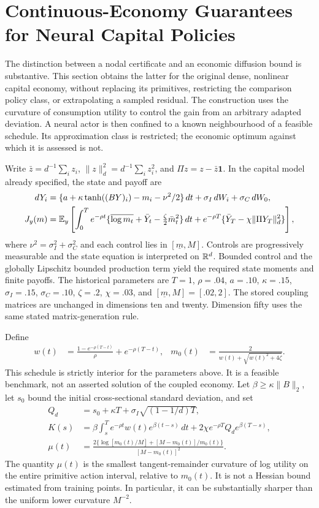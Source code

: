 \section{Continuous-Economy Guarantees for Neural Capital Policies}\label{sec:r10continuous}
The distinction between a nodal certificate and an economic diffusion bound is substantive. This section obtains the latter for the original dense, nonlinear capital economy, without replacing its primitives, restricting the comparison policy class, or extrapolating a sampled residual. The construction uses the curvature of consumption utility to control the gain from an arbitrary adapted deviation. A neural actor is then confined to a known neighbourhood of a feasible schedule. Its approximation class is restricted; the economic optimum against which it is assessed is not.

Write $\bar z=d^{-1}\sum_i z_i$, $\|z\|_d^2=d^{-1}\sum_i z_i^2$, and $\Pi z=z-\bar z\bm1$. In the capital model already specified, the state and payoff are
\begin{align}
 dY_i&=\{a+\kappa\tanh((BY)_i)-m_i-\nu^2/2\}\,dt
       +\sigma_I\,dW_i+\sigma_C\,dW_0,\label{eq:r10state}\\
 J_y(m)&=\mathbb E_y\left[\int_0^T e^{-\rho t}
  \{\overline{\log m_t}+\bar Y_t-\tfrac\zeta2\bar m_t^2\}\,dt
  +e^{-\rho T}\{\bar Y_T-\chi\|\Pi Y_T\|_d^2\}\right],\label{eq:r10payoff}
\end{align}
where $\nu^2=\sigma_I^2+\sigma_C^2$ and each control lies in $[\underline m,M]$. Controls are progressively measurable and the state equation is interpreted on $\mathbb R^d$. Bounded control and the globally Lipschitz bounded production term yield the required state moments and finite payoffs. The historical parameters are $T=1$, $\rho=.04$, $a=.10$, $\kappa=.15$, $\sigma_I=.15$, $\sigma_C=.10$, $\zeta=.2$, $\chi=.03$, and $[\underline m,M]=[.02,2]$. The stored coupling matrices are unchanged in dimensions ten and twenty. Dimension fifty uses the same stated matrix-generation rule.

Define
\begin{align}
 w(t)&=\frac{1-e^{-\rho(T-t)}}{\rho}+e^{-\rho(T-t)},&
 m_0(t)&=\frac{2}{w(t)+\sqrt{w(t)^2+4\zeta}}.\label{eq:r10anchor}
\end{align}
This schedule is strictly interior for the parameters above. It is a feasible benchmark, not an asserted solution of the coupled economy. Let $\beta\geq\kappa\|B\|_2$, let $s_0$ bound the initial cross-sectional standard deviation, and set
\begin{align}
 Q_d&=s_0+\kappa T+\sigma_I\sqrt{(1-1/d)T},\label{eq:r10Q}\\
 K(s)&=\beta\int_s^T e^{-\rho t}w(t)e^{\beta(t-s)}\,dt
       +2\chi e^{-\rho T}Q_de^{\beta(T-s)},\label{eq:r10K}\\
 \mu(t)&=\frac{2\{\log[m_0(t)/M]+[M-m_0(t)]/m_0(t)\}}
                    {[M-m_0(t)]^2}.\label{eq:r10mu}
\end{align}
The quantity $\mu(t)$ is the smallest tangent-remainder curvature of log utility on the entire primitive action interval, relative to $m_0(t)$. It is not a Hessian bound estimated from training points. In particular, it can be substantially sharper than the uniform lower curvature $M^{-2}$.

